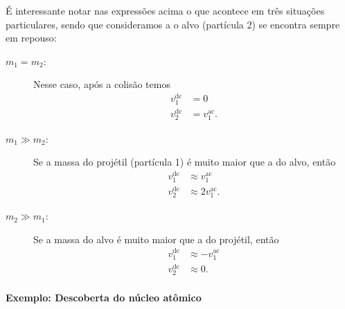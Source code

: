 É interessante notar nas expressões acima o que acontece em três situações particulares, sendo que consideramos a o alvo (partícula 2) se encontra sempre em repouso:
\begin{description}
    \item[$m_1 = m_2$:] Nesse caso, após a colisão temos
    \begin{align}
        v_1^{\textrm{dc}} &= 0 \\
        v_2^{\textrm{dc}} &= v_1^{\textrm{ac}}.
    \end{align}
    
    \item[$m_1 \gg m_2$:] Se a massa do projétil (partícula 1) é muito maior que a do alvo, então 
    \begin{align}
        v_1^{\textrm{dc}} &\approx v_1^{\textrm{ac}} \\
        v_2^{\textrm{dc}} &\approx 2 v_1^{\textrm{ac}}.
    \end{align}
    
    \item[$m_2 \gg m_1$:] Se a massa do alvo é muito maior que a do projétil, então 
    \begin{align}
        v_1^{\textrm{dc}} &\approx -v_1^{\textrm{ac}} \\
        v_2^{\textrm{dc}} &\approx 0.
    \end{align}
\end{description}

\paragraph{Exemplo: Descoberta do núcleo atômico}

